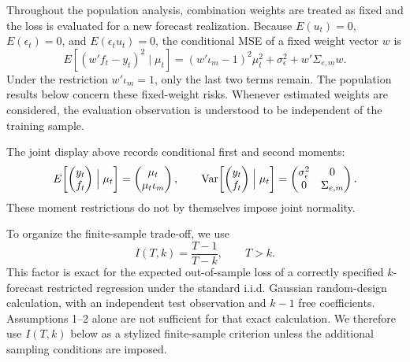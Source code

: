 

Throughout the population analysis, combination weights are treated as fixed
and the loss is evaluated for a new forecast realization.  Because
$E(u_t)=0$, $E(\epsilon_t)=0$, and $E(\epsilon_tu_t)=0$, the conditional MSE
of a fixed weight vector $w$ is
\[
 E\!\left[(w'f_t-y_t)^2\mid\mu_t\right]
 = (w'\iota_m-1)^2\mu_t^2+\sigma_\epsilon^2+w'\Sigma_{e,m}w.
\]
Under the restriction $w'\iota_m=1$, only the last two terms remain.  The
population results below concern these fixed-weight risks.  Whenever estimated
weights are considered, the evaluation observation is understood to be
independent of the training sample.

The joint display above records conditional first and second moments:
\[
 E\!\left[
 \begin{pmatrix}y_t\\ f_t\end{pmatrix}\Bigm|\mu_t
 \right]
 =
 \begin{pmatrix}\mu_t\\ \mu_t\iota_m\end{pmatrix},
 \qquad
 \operatorname{Var}\!\left[
 \begin{pmatrix}y_t\\ f_t\end{pmatrix}\Bigm|\mu_t
 \right]
 =
 \begin{pmatrix}\sigma_\epsilon^2&0\\0&\Sigma_{e,m}\end{pmatrix}.
\]
These moment restrictions do not by themselves impose joint normality.


To organize the finite-sample trade-off, we use
\[
 I(T,k)=\frac{T-1}{T-k}, \qquad T>k.
\]
This factor is exact for the expected out-of-sample loss of a correctly
specified $k$-forecast restricted regression under the standard i.i.d.
Gaussian random-design calculation, with an independent test observation and
$k-1$ free coefficients.  Assumptions 1--2 alone are not sufficient for that
exact calculation.  We therefore use $I(T,k)$ below as a stylized
finite-sample criterion unless the additional sampling conditions are imposed.

